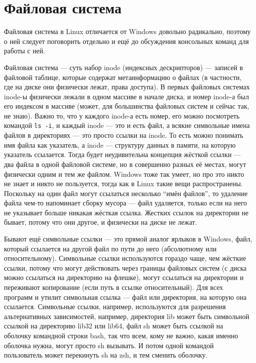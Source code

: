 \documentclass{../../text-style}
\begin{document}
\maketitle
\thispagestyle{empty}

\section{Файловая система}

Файловая система в Linux отличается от Windows довольно радикально, поэтому о ней следует поговорить отдельно и ещё до обсуждения консольных команд для работы с ней.

Файловая система --- суть набор inode (индексных дескрипторов) --- записей в файловой таблице, которые содержат метаинформацию о файлах (в частности, где на диске они физически лежат, права доступа).
В первых файловых системах inode-ы физически лежали в одном массиве в начале диска, и номер inode-а был его индексом в массиве (может, для большинства файловых систем и сейчас так, не знаю).
Важно то, что у каждого inode-а есть номер, его можно посмотреть командой \verb|ls -i|, и каждый inode --- это и есть файл, а всякие символьные имена файлов в директориях --- это просто ссылки на inode.
То есть можно понимать имя файла как указатель, а inode --- структуру данных в памяти, на которую указатель ссылается. 
Тогда будет неудивительна концепция жёсткой ссылки --- два файла в одной файловой системе, но в совершенно разных её местах, могут физически одним и тем же файлом.
Windows тоже так умеет, но про это никто не знает и никто не пользуется, тогда как в Linux такие вещи распространены.
Поскольку на один файл могут ссылаться несколько \enquote{имён файлов}, то удаление файла чем-то напоминает сборку мусора --- файл удаляется, только если на него не указывает больше никакая жёсткая ссылка.
Жестких ссылок на директории не бывает, потому что они другое, и физически на диске не лежат.

Бывают ещё символьные ссылки --- это прямой аналог ярлыков в Windows, файл, который ссылается на другой файл по пути до него (абсолютному или относительному).
Символьные ссылки используются гораздо чаще, чем жёсткие ссылки, потому что могут действовать через границы файловых систем (с диска можно ссылаться на директорию на флешке), могут ссылаться на директории и переживают копирование (если путь в ссылке относительный).
Для всех программ и утилит символьная ссылка --- файл или директория, на которую она ссылается.
Символьные ссылки, например, используются для разрешения альтернативных зависимостей, например, директория lib может быть символьной ссылкой на директорию lib32 или lib64, файл sh может быть ссылкой на оболочку командной строки bash, так что всем, кому не важно, какая именно оболочка нужна, могут просто sh вызывать.
И потом одной командой пользователь может перекинуть sh на zsh, и тем сменить оболочку.
\end{document}
